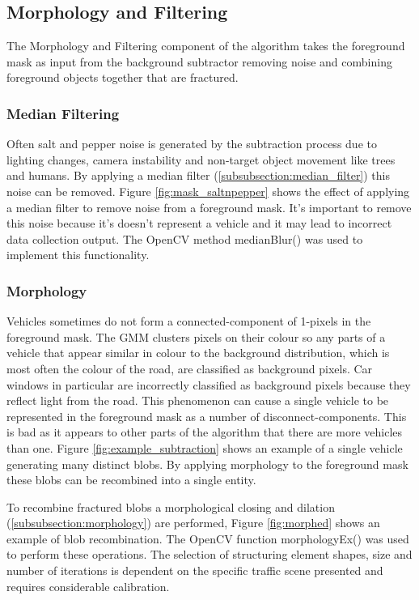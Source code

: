 \subsection{Morphology and Filtering}

The Morphology and Filtering component of the algorithm takes the foreground mask as input from the background subtractor removing noise and combining foreground objects together that are fractured. 

\subsubsection{Median Filtering}

Often salt and pepper noise is generated by the subtraction process due to lighting changes, camera instability and non-target object movement like trees and humans. By applying a median filter (\ref{subsubsection:median_filter}) this noise can be removed. Figure \ref{fig:mask_saltnpepper} shows the effect of applying a median filter to remove noise from a foreground mask. It's important to remove this noise because it's doesn't represent a vehicle and it may lead to incorrect data collection output. The OpenCV method medianBlur() was used to implement this functionality.

\subsubsection{Morphology}

Vehicles sometimes do not form a connected-component of 1-pixels in the foreground mask. The GMM clusters pixels on their colour so any parts of a vehicle that appear similar in colour to the background distribution, which is most often the colour of the road, are classified as background pixels. Car windows in particular are incorrectly classified as background pixels because they reflect light from the road. This phenomenon can cause a single vehicle to be represented in the foreground mask as a number of disconnect-components. This is bad as it appears to other parts of the algorithm that there are more vehicles than one. Figure \ref{fig:example_subtraction} shows an example of a single vehicle generating many distinct blobs. By applying morphology to the foreground mask these blobs can be recombined into a single entity.

To recombine fractured blobs a morphological closing and dilation (\ref{subsubsection:morphology}) are performed, Figure \ref{fig:morphed} shows an example of blob recombination. The OpenCV function morphologyEx() was used to perform these operations. The selection of structuring element shapes, size and number of iterations is dependent on the specific traffic scene presented and requires considerable calibration. 

